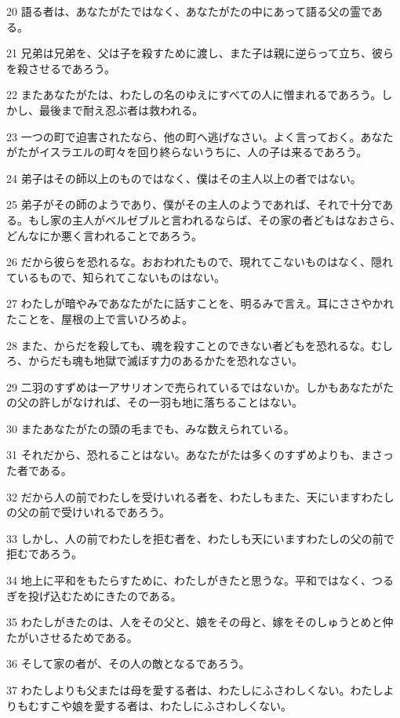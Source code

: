 \par 20 語る者は、あなたがたではなく、あなたがたの中にあって語る父の霊である。
\par 21 兄弟は兄弟を、父は子を殺すために渡し、また子は親に逆らって立ち、彼らを殺させるであろう。
\par 22 またあなたがたは、わたしの名のゆえにすべての人に憎まれるであろう。しかし、最後まで耐え忍ぶ者は救われる。
\par 23 一つの町で迫害されたなら、他の町へ逃げなさい。よく言っておく。あなたがたがイスラエルの町々を回り終らないうちに、人の子は来るであろう。
\par 24 弟子はその師以上のものではなく、僕はその主人以上の者ではない。
\par 25 弟子がその師のようであり、僕がその主人のようであれば、それで十分である。もし家の主人がベルゼブルと言われるならば、その家の者どもはなおさら、どんなにか悪く言われることであろう。
\par 26 だから彼らを恐れるな。おおわれたもので、現れてこないものはなく、隠れているもので、知られてこないものはない。
\par 27 わたしが暗やみであなたがたに話すことを、明るみで言え。耳にささやかれたことを、屋根の上で言いひろめよ。
\par 28 また、からだを殺しても、魂を殺すことのできない者どもを恐れるな。むしろ、からだも魂も地獄で滅ぼす力のあるかたを恐れなさい。
\par 29 二羽のすずめは一アサリオンで売られているではないか。しかもあなたがたの父の許しがなければ、その一羽も地に落ちることはない。
\par 30 またあなたがたの頭の毛までも、みな数えられている。
\par 31 それだから、恐れることはない。あなたがたは多くのすずめよりも、まさった者である。
\par 32 だから人の前でわたしを受けいれる者を、わたしもまた、天にいますわたしの父の前で受けいれるであろう。
\par 33 しかし、人の前でわたしを拒む者を、わたしも天にいますわたしの父の前で拒むであろう。
\par 34 地上に平和をもたらすために、わたしがきたと思うな。平和ではなく、つるぎを投げ込むためにきたのである。
\par 35 わたしがきたのは、人をその父と、娘をその母と、嫁をそのしゅうとめと仲たがいさせるためである。
\par 36 そして家の者が、その人の敵となるであろう。
\par 37 わたしよりも父または母を愛する者は、わたしにふさわしくない。わたしよりもむすこや娘を愛する者は、わたしにふさわしくない。
